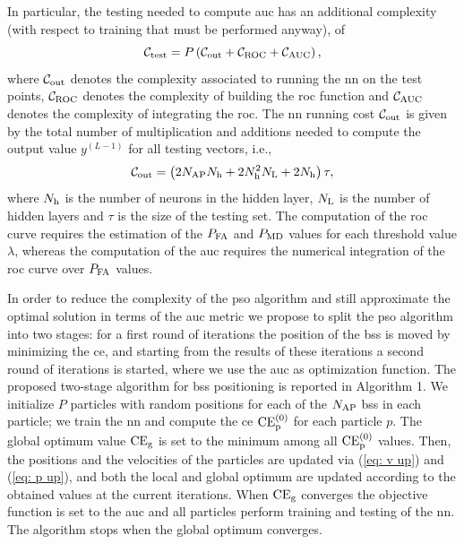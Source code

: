 \documentclass[conference,draftcls,onecolumn]{IEEEtran}
\begin{document}
In particular, the testing needed to compute \ac{auc} has an additional complexity (with respect to training that must be performed anyway), of 
\begin{equation}
    \mathcal{C}_{\rm test} = P \left( \mathcal{C}_{\rm out}+\mathcal{C}_{\rm ROC}+\mathcal{C}_{\rm AUC}\right),
\end{equation}
where  $\mathcal{C}_{\rm out}$ denotes the complexity associated to running the \ac{nn} on the test points, $\mathcal{C}_{\rm ROC}$ denotes the complexity of building the \ac{roc} function and $\mathcal{C}_{\rm AUC}$ denotes the complexity of integrating the \ac{roc}. The \ac{nn} running cost $\mathcal{C}_{\rm out}$ is given by the total number of multiplication and additions needed to compute the output value $y^{(L-1)}$ for all testing vectors, i.e.,
\begin{equation}
    \mathcal{C}_{\rm out} = \left(2N_{\rm AP}N_{\rm h}+2N_{\rm h}^2N_{\rm L} + 2N_{\rm h}\right)\tau ,
\end{equation}
where $N_{\rm h}$ is the number of neurons in the hidden layer, $N_{\rm L}$ is the number of hidden layers and $\tau$ is the size of the testing set.
The computation of the \ac{roc} curve requires the estimation of the $P_{\rm FA}$ and $P_{\rm MD}$ values for each threshold value $\lambda$, whereas the computation of the \ac{auc} requires the numerical integration of the \ac{roc} curve over $P_{\rm FA}$ values.

In order to reduce the complexity of the \ac{pso} algorithm and still approximate the optimal solution in terms of the \ac{auc} metric we propose to split the \ac{pso} algorithm into two stages: for a first round of iterations the position of the \acp{bs} is moved by minimizing the \ac{ce}, and starting from the results of these iterations a second round  of iterations is started, where we use the \ac{auc} as optimization function. 
The proposed two-stage algorithm for \acp{bs} positioning is reported in Algorithm 1. We initialize $P$ particles with random positions for each of the $N_{\rm AP}$ \acp{bs} in each particle; we train the \ac{nn} and compute the \ac{ce} $\rm{CE}_p^{(0)}$ for each particle $p$. The global optimum value $\rm{CE}_g$ is set to the minimum among all $\rm{CE}_p^{(0)}$ values. Then, the positions and the velocities of the particles are updated via (\ref{eq: v up}) and (\ref{eq: p up}), and both the local and global optimum are updated according to the obtained values at the current iterations. When $\rm{CE}_g$ converges the objective function is set to the \ac{auc} and all particles perform  training and testing of the \ac{nn}. The algorithm stops when the global optimum converges.
\end{document}
